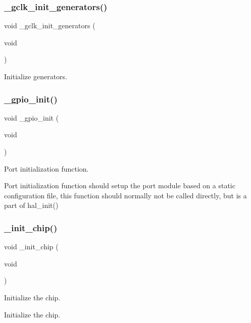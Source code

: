 \subsubsection{\texorpdfstring{\+\_\+gclk\+\_\+init\+\_\+generators()}{\_gclk\_init\_generators()}}
{\footnotesize\ttfamily void \+\_\+gclk\+\_\+init\+\_\+generators (\begin{DoxyParamCaption}\item[{void}]{ }\end{DoxyParamCaption})}



Initialize generators. 

\mbox{\label{group___h_p_l_ga6e226919d4a3ee84599b55a32597e284}} 
\subsubsection{\texorpdfstring{\+\_\+gpio\+\_\+init()}{\_gpio\_init()}}
{\footnotesize\ttfamily void \+\_\+gpio\+\_\+init (\begin{DoxyParamCaption}\item[{void}]{ }\end{DoxyParamCaption})}



Port initialization function. 

Port initialization function should setup the port module based on a static configuration file, this function should normally not be called directly, but is a part of hal\+\_\+init() \mbox{\label{group___h_p_l_gac10942d1aec3f0ce14117119db5e9555}} 
\subsubsection{\texorpdfstring{\+\_\+init\+\_\+chip()}{\_init\_chip()}}
{\footnotesize\ttfamily void \+\_\+init\+\_\+chip (\begin{DoxyParamCaption}\item[{void}]{ }\end{DoxyParamCaption})}



Initialize the chip. 

Initialize the chip. \mbox{\label{group___h_p_l_ga80f1b1a044a8773e23b38517296620b4}} 
